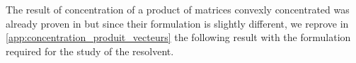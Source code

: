 \documentclass{ws-rmta}
\begin{document}
The result of concentration of a product of matrices convexly concentrated was already proven in \cite{MEC11} but since their formulation is slightly different, we reprove in \ref{app:concentration_produit_vecteurs} the following result with the formulation required for the study of the resolvent.
\end{document}
